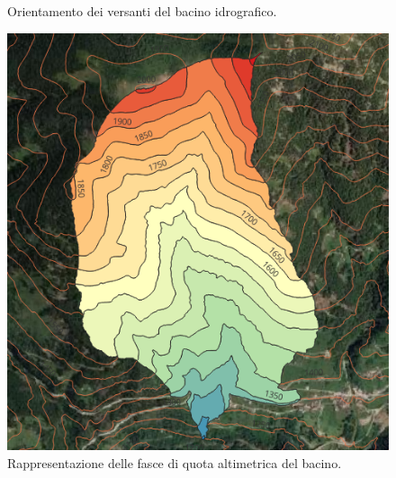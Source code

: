\begin{figure}[H]
\begin{minipage}[]{7cm}
        \caption{Orientamento dei versanti del bacino idrografico.}
    \end{minipage} 
        \end{figure}
       
\begin{figure}[H]  \centering
        \begin{minipage}[]{7cm}	
            \includegraphics[scale=0.6]{immagini/bacino_fasce_quota_qgis.PNG}
        \caption{Rappresentazione delle fasce di quota altimetrica del bacino.}
        \end{minipage}  
\end{figure}
